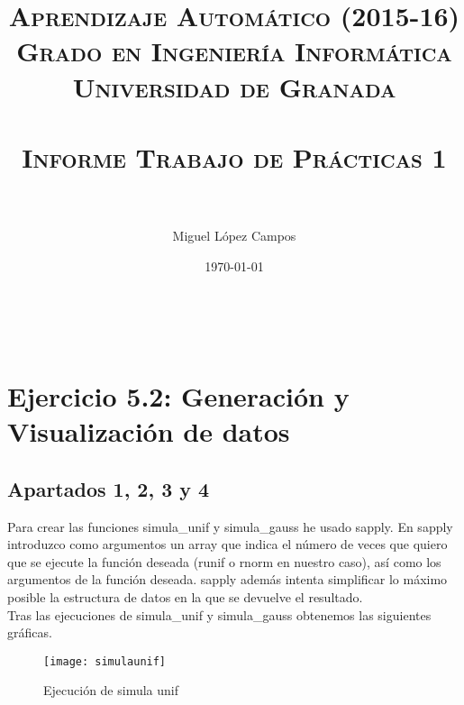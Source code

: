 

\title{
\normalfont \normalsize 
\textsc{{\bf Aprendizaje Automático (2015-16) \\ Grado en Ingeniería Informática \\ Universidad de Granada} \\ [25pt] %
\horrule{0.5pt} \\[0.4cm] %
\huge Informe Trabajo de Prácticas 1 \\ %
\horrule{2pt} \\[0.5cm] %
}}
\author{Miguel López Campos} %

\date{\normalsize\today} %


	
	\maketitle %
	\newpage %
	
	\tableofcontents %
	\listoffigures

	
	\newpage
	
	\
	
	\section{Ejercicio 5.2: Generación y Visualización de datos}
	\subsection{Apartados 1, 2, 3 y 4}
	Para crear las funciones simula\_unif y simula\_gauss he usado sapply. En sapply introduzco como argumentos un array que indica el número de veces que quiero que se ejecute la función deseada (runif o rnorm en nuestro caso), así como los argumentos de la función deseada. sapply además intenta simplificar lo máximo posible la estructura de datos en la que se devuelve el resultado. 
	\\
	
	Tras las ejecuciones de simula\_unif y simula\_gauss obtenemos las siguientes gráficas.
	\begin{figure} [H]
	\centering
	\texttt{[image: simulaunif]}
	\caption{Ejecución de simula unif}
	\label{fig:simula_unif}
	\end{figure}

